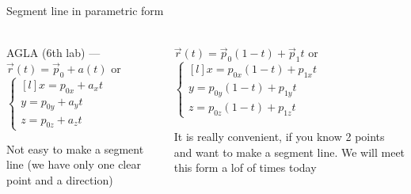 \documentclass[aspectratio=169,notes]{beamer}
\begin{document}
\begin{frame}[t]{Segment line in parametric form}
\framesubtitle{}
    \begin{columns}[T,onlytextwidth]
        \begin{column}{0.49\textwidth}
            AGLA (6th lab) --- $\vec{r}(t)=\vec{p}_0+a(t)$ or \\ $\left\{\begin{matrix*}[l]
            x = p_{0x} + a_x t\\ 
            y = p_{0y} + a_y t\\
            z = p_{0z} + a_z t
            \end{matrix*}\right.$

        {Not easy to make a segment line (we have only one clear point and a direction)}
        \end{column}
        \begin{column}{0.49\textwidth}
            $\vec{r}(t)=\vec{p}_0(1-t)+\vec{p}_1 t$ or $\left\{\begin{matrix*}[l]
                x = p_{0x}(1-t) + p_{1x} t\\ 
                y = p_{0y}(1-t) + p_{1y} t\\
                z = p_{0z}(1-t) + p_{1z} t
                \end{matrix*}\right.$

                {It is really convenient, if you know 2 points and want to make a segment line. We will meet this form a lof of times today}
        \end{column}
    \end{columns}
\end{frame}
\end{document}
